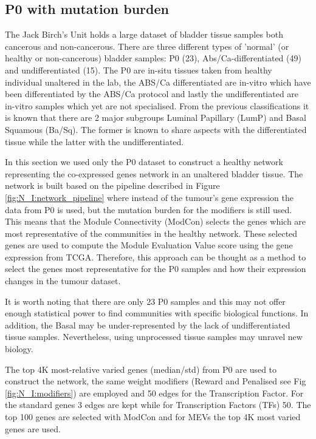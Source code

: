 

\subsection{P0 with mutation burden} \label{s:p0}

 
The Jack Birch's Unit holds a large dataset of bladder tissue samples both cancerous and non-cancerous. There are three different types of 'normal'  (or healthy or non-cancerous) bladder samples: P0 (23), Abs/Ca-differentiated (49) and undifferentiated (15). The P0 are in-situ tissues taken from healthy individual unaltered in the lab, the ABS/Ca differentiated are in-vitro which have been differentiated by the ABS/Ca protocol and lastly the undifferentiated are in-vitro samples which yet are not specialised. From the previous classifications \citet{Robertson2017-mg, Kamoun2020-tj} it is known that there are 2 major subgroups Luminal Papillary (LumP) and Basal Squamous (Ba/Sq). The former is known to share aspects with the differentiated tissue while the latter with the undifferentiated. 

In this section we used only the P0 dataset to construct a healthy network representing the co-expressed genes network in an unaltered bladder tissue. The network is built based on the pipeline described in Figure \ref{fig:N_I:network_pipeline} where instead of the tumour's gene expression the data from P0 is used, but the mutation burden for the modifiers is still used. This means that the Module Connectivity (ModCon) selects the genes which are most representative of the communities in the healthy network. These selected genes are used to compute the Module Evaluation Value score using the gene expression from TCGA. Therefore, this approach can be thought as a method to select the genes most representative for the P0 samples and how their expression changes in the tumour dataset. 

It is worth noting that there are only 23 P0 samples and this may not offer enough statistical power to find communities with specific biological functions. In addition, the Basal may be under-represented by the lack of undifferentiated tissue samples. Nevertheless, using unprocessed tissue samples may unravel new biology.

The top 4K most-relative varied genes (median/std) from P0 are used to construct the network, the same weight modifiers (Reward and Penalised see Fig \ref{fig:N_I:modifiers}) are employed and 50 edges for the Transcription Factor. For the standard genes 3 edges are kept while for Transcription Factors (TFs) 50. The top 100 genes are selected with ModCon and for MEVs the top 4K most varied genes are used.


